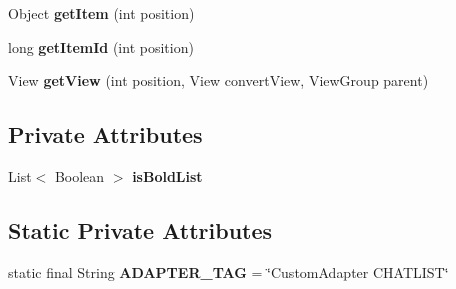 \begin{DoxyCompactItemize}
\item 
Object {\bfseries get\+Item} (int position)\hypertarget{classcom_1_1example_1_1sebastian_1_1tindertp_1_1chatListTools_1_1CustomAdapter_a13c8a00b31faddc336d628afaaa83846}{}\label{classcom_1_1example_1_1sebastian_1_1tindertp_1_1chatListTools_1_1CustomAdapter_a13c8a00b31faddc336d628afaaa83846}

\item 
long {\bfseries get\+Item\+Id} (int position)\hypertarget{classcom_1_1example_1_1sebastian_1_1tindertp_1_1chatListTools_1_1CustomAdapter_a69e9e1b193640947f6faf1ac279f6c45}{}\label{classcom_1_1example_1_1sebastian_1_1tindertp_1_1chatListTools_1_1CustomAdapter_a69e9e1b193640947f6faf1ac279f6c45}

\item 
View {\bfseries get\+View} (int position, View convert\+View, View\+Group parent)\hypertarget{classcom_1_1example_1_1sebastian_1_1tindertp_1_1chatListTools_1_1CustomAdapter_aaecb8b8fbf62b27f875306fe50b2805e}{}\label{classcom_1_1example_1_1sebastian_1_1tindertp_1_1chatListTools_1_1CustomAdapter_aaecb8b8fbf62b27f875306fe50b2805e}

\end{DoxyCompactItemize}
\subsection*{Private Attributes}
\begin{DoxyCompactItemize}
\item 
List$<$ Boolean $>$ {\bfseries is\+Bold\+List}\hypertarget{classcom_1_1example_1_1sebastian_1_1tindertp_1_1chatListTools_1_1CustomAdapter_a94d04d0f12ecdaab9b8265f28ba42fa0}{}\label{classcom_1_1example_1_1sebastian_1_1tindertp_1_1chatListTools_1_1CustomAdapter_a94d04d0f12ecdaab9b8265f28ba42fa0}

\end{DoxyCompactItemize}
\subsection*{Static Private Attributes}
\begin{DoxyCompactItemize}
\item 
static final String {\bfseries A\+D\+A\+P\+T\+E\+R\+\_\+\+T\+AG} = \char`\"{}Custom\+Adapter C\+H\+A\+T\+L\+I\+ST\char`\"{}\hypertarget{classcom_1_1example_1_1sebastian_1_1tindertp_1_1chatListTools_1_1CustomAdapter_a5d8877525e59a96729da8556732318ce}{}\label{classcom_1_1example_1_1sebastian_1_1tindertp_1_1chatListTools_1_1CustomAdapter_a5d8877525e59a96729da8556732318ce}

\end{DoxyCompactItemize}


